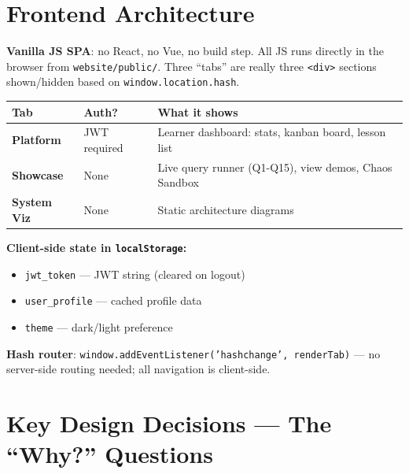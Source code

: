 \documentclass[11pt,a4paper]{article}
\newcommand{\T}[1]{\texttt{#1}}          %
\begin{document}
\section{Frontend Architecture}

\begin{defbox}
\textbf{Vanilla JS SPA}: no React, no Vue, no build step. All JS runs directly in the
browser from \T{website/public/}. Three ``tabs'' are really three \T{<div>} sections
shown/hidden based on \T{window.location.hash}.
\end{defbox}

\begin{center}
\renewcommand{\arraystretch}{1.2}
\begin{tabular}{@{}p{2.8cm}p{2.5cm}p{7.5cm}@{}}
\toprule
\textbf{Tab} & \textbf{Auth?} & \textbf{What it shows} \\
\midrule
\textbf{Platform}    & JWT required & Learner dashboard: stats, kanban board, lesson list \\
\textbf{Showcase}    & None          & Live query runner (Q1-Q15), view demos, Chaos Sandbox \\
\textbf{System Viz}  & None          & Static architecture diagrams \\
\bottomrule
\end{tabular}
\end{center}

\textbf{Client-side state in \T{localStorage}:}
\begin{itemize}[nosep, leftmargin=1.5em]
  \item \T{jwt\_token} — JWT string (cleared on logout)
  \item \T{user\_profile} — cached profile data
  \item \T{theme} — dark/light preference
\end{itemize}

\textbf{Hash router}: \T{window.addEventListener('hashchange', renderTab)} — no
server-side routing needed; all navigation is client-side.

\section{Key Design Decisions --- The ``Why?'' Questions}
\end{document}
